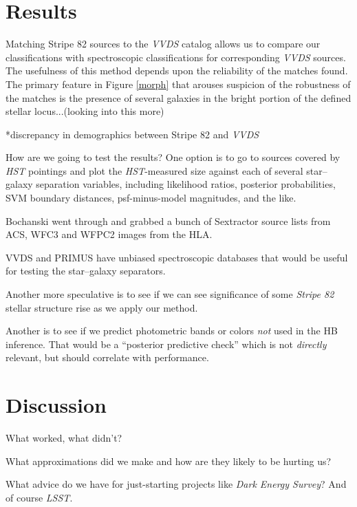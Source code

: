 \documentclass[12pt]{article}
\newcommand{\project}[1]{\textsl{#1}}
\begin{document}
\section{Results}
Matching Stripe 82 sources to the \project{VVDS} catalog allows us to compare our classifications with spectroscopic classifications for corresponding \project{VVDS} sources. The usefulness of this method depends upon the reliability of the matches found. The primary feature in Figure \ref{morph} that arouses suspicion of the robustness of the matches is the presence of several galaxies in the bright portion of the defined stellar locus...(looking into this more)

*discrepancy in demographics between Stripe 82 and \project{VVDS}

How are we going to test the results?  One option is to go to sources
covered by \project{HST} pointings and plot the \project{HST}-measured
size against each of several star--galaxy separation variables,
including likelihood ratios, posterior probabilities, SVM boundary
distances, psf-minus-model magnitudes, and the like.

Bochanski went through and grabbed a bunch of Sextractor source lists
from ACS, WFC3 and WFPC2 images from the HLA.

VVDS and PRIMUS have unbiased spectroscopic databases that would be
useful for testing the star--galaxy separators. 

Another more speculative is to see if we can see significance of some
\project{Stripe 82} stellar structure rise as we apply our method.

Another is to see if we predict photometric bands or colors \emph{not}
used in the HB inference.  That would be a ``posterior predictive
check'' which is not \emph{directly} relevant, but should correlate
with performance.

\section{Discussion}

What worked, what didn't?

What approximations did we make and how are they likely to be hurting
us?

What advice do we have for just-starting projects like \project{Dark
  Energy Survey}?  And of course \project{LSST}.
\end{document}

